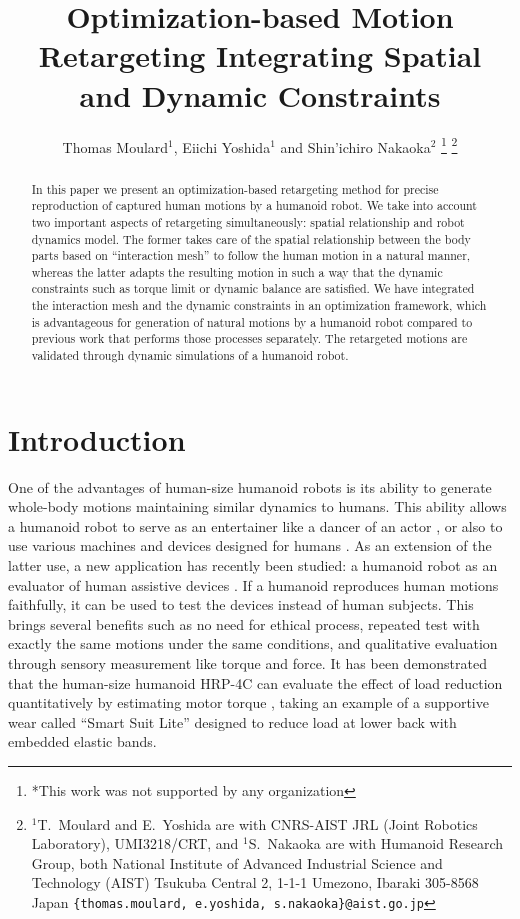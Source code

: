 \documentclass[letterpaper, 10 pt, conference]{ieeeconf}  %
\title{\LARGE \bf
Optimization-based Motion Retargeting Integrating Spatial and Dynamic Constraints
}
\author{Thomas Moulard$^{1}$, Eiichi Yoshida$^{1}$ and Shin'ichiro
  Nakaoka$^{2}$%
\thanks{*This work was not supported by any organization}%
\thanks{$^{1}$T.~Moulard and E.~Yoshida are with CNRS-AIST JRL (Joint
  Robotics Laboratory), UMI3218/CRT, and $^{1}$S.~Nakaoka are with
  Humanoid Research Group, both National Institute of Advanced Industrial Science and Technology (AIST)
Tsukuba Central 2, 1-1-1 Umezono, Ibaraki 305-8568 Japan
        {\tt\footnotesize \{thomas.moulard, e.yoshida, s.nakaoka\}@aist.go.jp}}%
}
\begin{document}
\maketitle
\thispagestyle{empty}
\pagestyle{empty}


\begin{abstract}
In this paper we present an optimization-based retargeting method for
precise reproduction of captured human motions by a humanoid robot.
We take into account two important aspects of retargeting
simultaneously: spatial relationship and robot dynamics model.
The former takes care of the spatial relationship between the body
parts based on ``interaction mesh'' to follow the human motion in a
natural manner, whereas the latter adapts the resulting motion in such
a way that the dynamic constraints such as torque limit or dynamic
balance are satisfied. 
We have integrated the interaction mesh and the dynamic constraints in an
optimization framework, which is advantageous for generation of
natural motions by a humanoid robot compared to 
previous work that performs those processes separately. The retargeted
motions are validated through dynamic simulations of a humanoid robot.
\end{abstract}


\section{Introduction}
\label{sec:intro}

One of the advantages of human-size humanoid robots is
its ability to generate whole-body motions maintaining similar
dynamics to humans. 
This ability allows a humanoid robot to serve as an entertainer like
a dancer of an actor \cite{nakaoka_iros2010}, or also to use various
machines and devices designed for humans \cite{Yokoi03iros}.
As an extension of the latter use, a new application
has recently been studied: a humanoid robot as an evaluator of human
assistive devices \cite{Takanishi06ICRA,Miura13ICRA}.
If a humanoid reproduces human motions faithfully, it can be used to
test the devices instead of human subjects. 
This brings several benefits such as no need for ethical 
process, repeated test with exactly the same motions under the same
conditions, and qualitative evaluation through sensory measurement
like torque and force.
It has been demonstrated that the human-size humanoid HRP-4C
\cite{Kaneko09Humanoids}  can evaluate the effect of load reduction
quantitatively by estimating motor torque \cite{Miura13ICRA}, taking
an example of a supportive wear called ``Smart Suit Lite''
\cite{Tanaka11JRM} designed to reduce load 
at lower back with embedded elastic bands. 
\end{document}
